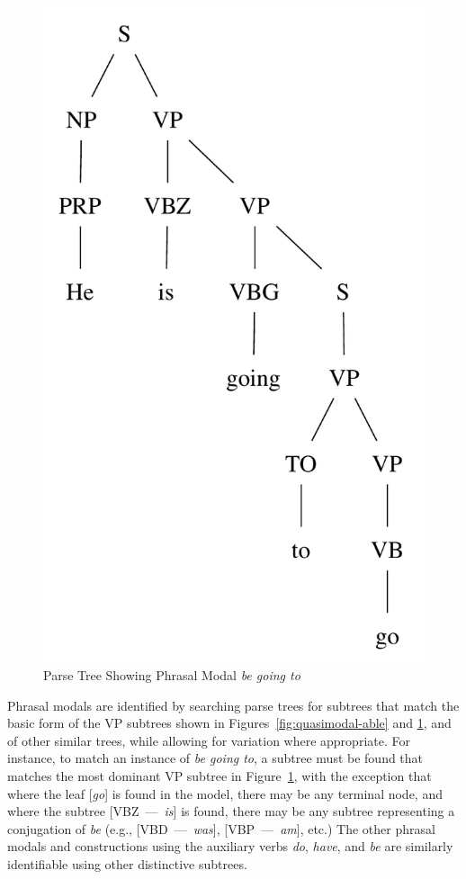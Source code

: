 \documentclass[main.tex]{subfiles}
\begin{document}
\begin{figure}[htbp]
\centering
\includegraphics[scale=0.6]{modal-going.pdf}
\caption{Parse Tree Showing Phrasal Modal \textit{be going to}}
\label{fig:quasimodal-going}
\end{figure}

Phrasal modals are identified by searching parse trees for subtrees that match the basic form of the VP subtrees shown in Figures~\ref{fig:quasimodal-able} and \ref{fig:quasimodal-going}, and of other similar trees, while allowing for variation where appropriate. For instance, to match an instance of \textit{be going to}, a subtree must be found that matches the most dominant VP subtree in Figure~\ref{fig:quasimodal-going}, with the exception that where the leaf [\textit{go}] is found in the model, there may be any terminal node, and where the subtree [VBZ~---~\textit{is}] is found, there may be any subtree representing a conjugation of \textit{be} (e.g., [VBD~---~\textit{was}], [VBP~---~\textit{am}], etc.) The other phrasal modals and constructions using the auxiliary verbs \textit{do}, \textit{have}, and \textit{be} are similarly identifiable using other distinctive subtrees.
\end{document}
